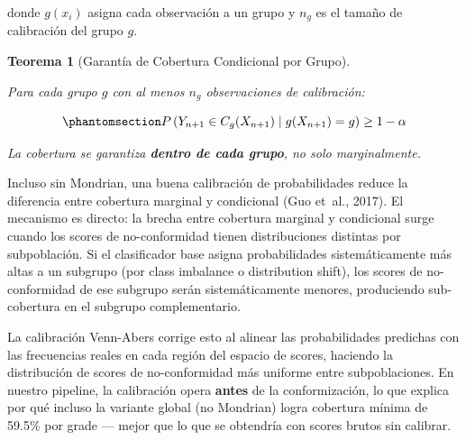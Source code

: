 \documentclass[
  spanish,
  11pt,
  letterpaper,
]{scrbook}
\theoremstyle{plain}
\newtheorem{theorem}{Teorema}[chapter]
\theoremstyle{remark}
\begin{document}
donde \(g(x_i)\) asigna cada observación a un grupo y \(n_g\) es el
tamaño de calibración del grupo \(g\).

\begin{theorem}[Garantía de Cobertura Condicional por
Grupo]\protect\hypertarget{thm-mondrian-coverage}{}\label{thm-mondrian-coverage}

Para cada grupo \(g\) con al menos \(n_g\) observaciones de calibración:

\begin{equation}\protect\phantomsection\label{eq-mondrian-guarantee}{
P\left(Y_{n+1} \in C_g(X_{n+1}) \mid g(X_{n+1}) = g\right) \geq 1 - \alpha
}\end{equation}

La cobertura se garantiza \textbf{dentro de cada grupo}, no solo
marginalmente.

\end{theorem}

\begin{tcolorbox}[enhanced jigsaw, arc=.35mm, bottomrule=.15mm, bottomtitle=1mm, breakable, colback=white, colbacktitle=quarto-callout-note-color!10!white, colframe=quarto-callout-note-color-frame, coltitle=black, left=2mm, leftrule=.75mm, opacityback=0, opacitybacktitle=0.6, rightrule=.15mm, title=\textcolor{quarto-callout-note-color}{\faInfo}\hspace{0.5em}{Calibración reduce la brecha de cobertura condicional}, titlerule=0mm, toprule=.15mm, toptitle=1mm]

Incluso sin Mondrian, una buena calibración de probabilidades reduce la
diferencia entre cobertura marginal y condicional (Guo et~al., 2017). El
mecanismo es directo: la brecha entre cobertura marginal y condicional
surge cuando los scores de no-conformidad tienen distribuciones
distintas por subpoblación. Si el clasificador base asigna
probabilidades sistemáticamente más altas a un subgrupo (por class
imbalance o distribution shift), los scores de no-conformidad de ese
subgrupo serán sistemáticamente menores, produciendo sub-cobertura en el
subgrupo complementario.

La calibración Venn-Abers corrige esto al alinear las probabilidades
predichas con las frecuencias reales en cada región del espacio de
scores, haciendo la distribución de scores de no-conformidad más
uniforme entre subpoblaciones. En nuestro pipeline, la calibración opera
\textbf{antes} de la conformización, lo que explica por qué incluso la
variante global (no Mondrian) logra cobertura mínima de 59.5\% por grade
--- mejor que lo que se obtendría con scores brutos sin calibrar.

\end{tcolorbox}
\end{document}
